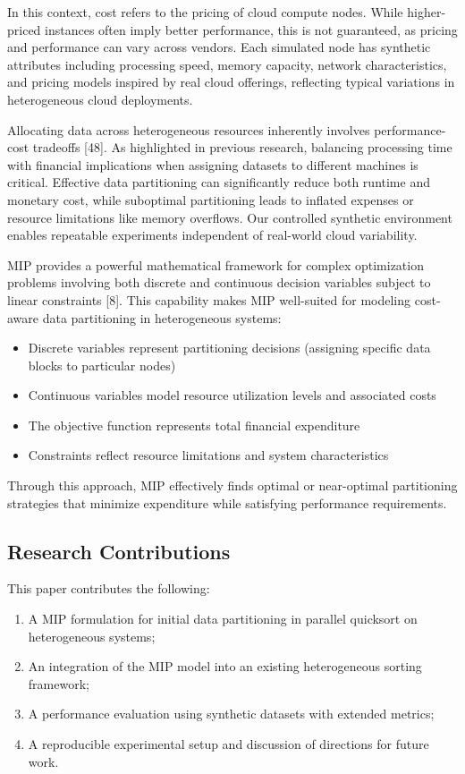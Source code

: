 \documentclass[]{interact}
\theoremstyle{plain}
\theoremstyle{definition}
\theoremstyle{remark}
\begin{document}
In this context, cost refers to the pricing of cloud compute nodes. While higher-priced instances often imply better performance, this is not guaranteed, as pricing and performance can vary across vendors. Each simulated node has synthetic attributes including processing speed, memory capacity, network characteristics, and pricing models inspired by real cloud offerings, reflecting typical variations in heterogeneous cloud deployments.

Allocating data across heterogeneous resources inherently involves performance-cost tradeoffs [48]. As highlighted in previous research, balancing processing time with financial implications when assigning datasets to different machines is critical. Effective data partitioning can significantly reduce both runtime and monetary cost, while suboptimal partitioning leads to inflated expenses or resource limitations like memory overflows. Our controlled synthetic environment enables repeatable experiments independent of real-world cloud variability.

MIP provides a powerful mathematical framework for complex optimization problems involving both discrete and continuous decision variables subject to linear constraints [8]. This capability makes MIP well-suited for modeling cost-aware data partitioning in heterogeneous systems:

\begin{itemize}
    \item Discrete variables represent partitioning decisions (assigning specific data blocks to particular nodes)
    \item Continuous variables model resource utilization levels and associated costs
    \item The objective function represents total financial expenditure
    \item Constraints reflect resource limitations and system characteristics
\end{itemize}

Through this approach, MIP effectively finds optimal or near-optimal partitioning strategies that minimize expenditure while satisfying performance requirements.

\subsection{Research Contributions}

This paper contributes the following:
\begin{enumerate}
    \item A MIP formulation for initial data partitioning in parallel quicksort on heterogeneous systems;
    \item An integration of the MIP model into an existing heterogeneous sorting framework;
    \item A performance evaluation using synthetic datasets with extended metrics;
    \item A reproducible experimental setup and discussion of directions for future work.
\end{enumerate}
\end{document}
